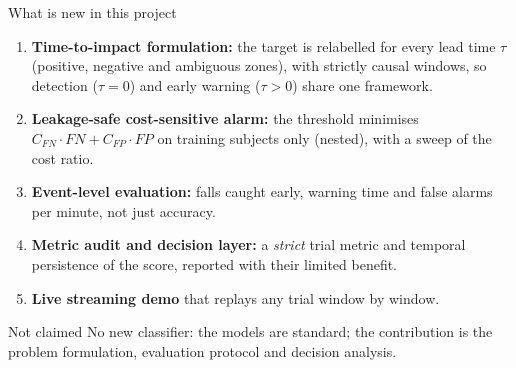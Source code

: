 \documentclass[aspectratio=169,11pt]{beamer}
\begin{document}
\begin{frame}{What is new in this project}
\small
\begin{enumerate}\setlength\itemsep{0.55em}
\item \textbf{Time-to-impact formulation:} the target is relabelled for every lead time $\tau$ (positive, negative and ambiguous zones), with strictly causal windows, so detection ($\tau=0$) and early warning ($\tau>0$) share one framework.
\item \textbf{Leakage-safe cost-sensitive alarm:} the threshold minimises $C_{FN}\cdot FN + C_{FP}\cdot FP$ on training subjects only (nested), with a sweep of the cost ratio.
\item \textbf{Event-level evaluation:} falls caught early, warning time and false alarms per minute, not just accuracy.
\item \textbf{Metric audit and decision layer:} a \emph{strict} trial metric and temporal persistence of the score, reported with their limited benefit.
\item \textbf{Live streaming demo} that replays any trial window by window.
\end{enumerate}
\vspace{0.3em}
\begin{alertblock}{Not claimed}
No new classifier: the models are standard; the contribution is the problem formulation, evaluation protocol and decision analysis.
\end{alertblock}
\end{frame}
\end{document}

